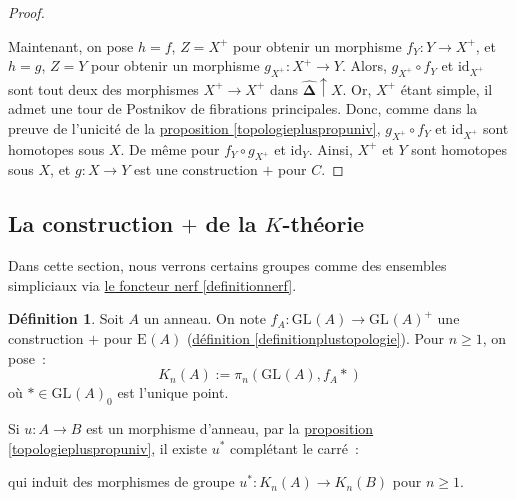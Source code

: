 \documentclass{amsart}
\newcommand{\sref}[2]{\hyperref[#2]{#1 \ref*{#2}}}
\theoremstyle{plain}
\theoremstyle{definition}
\newtheorem{defi}[theo]{Définition}
\theoremstyle{remark}
\newcommand{\id}{\mathrm{id}}
\newcommand{\DEns}{\widehat{\mathbf{\Delta}}}
\newcommand{\GL}[2]{\mathrm{GL}_{#1}(#2)}
\newcommand{\EGL}[2]{\mathrm{E}_{#1}(#2)}
\newcommand{\ra}{\rightarrow}
\begin{document}
\begin{proof}
\begin{center}
  \end{center}
  Maintenant, on pose $h=f$, $Z=X^+$ pour obtenir un morphisme $f_Y:Y\ra X^+$, et $h=g$, $Z=Y$ pour obtenir un morphisme $g_{X^+}:X^+\ra Y$.
  Alors, $g_{X^+}\circ f_Y$ et $\id_{X^+}$ sont tout deux des morphismes $X^+\ra X^+$ dans $\DEns\uparrow X$. Or, $X^+$ étant simple,
  il admet une tour de Postnikov de fibrations principales. Donc, comme dans la preuve de l'unicité de la \sref{proposition}{topologiepluspropuniv},
  $g_{X^+}\circ f_Y$ et $\id_{X^+}$ sont homotopes sous $X$. De même pour $f_Y\circ g_{X^+}$ et $\id_{Y}$.
  Ainsi, $X^+$ et $Y$ sont homotopes sous $X$, et $g:X\ra Y$ est une construction $+$ pour $C$.
\end{proof}

\subsection{\texorpdfstring{La construction $+$ de la $K$-théorie}{La construction + de la K-théorie}}

Dans cette section, nous verrons certains groupes comme des ensembles simpliciaux via \sref{le foncteur nerf}{definitionnerf}.

\begin{defi}
  Soit $A$ un anneau. On note $f_A:\GL{}{A}\ra\GL{}{A}^+$ une construction $+$ pour $\EGL{}{A}$ (\sref{définition}{definitionplustopologie}).
  Pour $n\geq 1$, on pose~:
  $$K_n(A):=\pi_{n}(\GL{}{A},f_A*)$$
  où $*\in \GL{}{A}_0$ est l'unique point.

  Si $u:A\ra B$ est un morphisme d'anneau, par la \sref{proposition}{topologiepluspropuniv}, il existe $u^*$ complétant le carré~:
  \begin{center}
  \end{center}
  qui induit des morphismes de groupe $u^*:K_n(A)\ra K_n(B)$ pour $n\geq 1$.
\end{defi}
\end{document}
